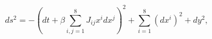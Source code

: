 \begin{equation}
\label{metn4iia2}
ds^2 = - \left( dt + \beta \sum_{i,j=1}^{8} J_{ij} x^i dx^j \right)^2
+ \sum_{i=1}^8 (dx^i)^2 + dy^2,
\end{equation}

